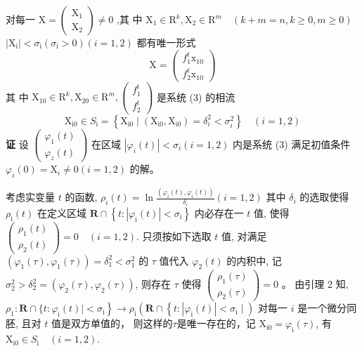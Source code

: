 \documentclass[12pt,a4paper,UTF8]{ctexart}
\begin{document}
对每一 $\mathrm{X}=\left(\begin{array}{l}\mathrm{X}_1 \\ \mathrm{X}_2\end{array}\right) \neq 0$ ,其 中 $\mathrm{X}_1 \in \mathrm{R}^k, \mathrm{X}_2 \in \mathrm{R}^m \quad(k+m=n, k \geq 0, m \geq 0)$ $\left|\mathrm{X}_{\mathrm{i}}\right|<\sigma_{\mathrm{i}}\left(\sigma_{\mathrm{i}}>0\right)(i=1,2)$ 都有唯一形式
$$
\mathrm{X}=\left(\begin{array}{l}
f_1^t \mathrm{x}_{10} \\
f_2^t \mathrm{x}_{10}
\end{array}\right)
$$
其 中 $\mathrm{X}_{10} \in \mathrm{R}^k, \mathrm{X}_{20} \in \mathrm{R}^m ,\left(\begin{array}{l}f_1^t \\ f_2^{t}\end{array}\right)$ 是系统 (3) 的相流
$$
\mathrm{X}_{\mathrm{i} 0} \in S_{\mathrm{i}}=\left\{\mathrm{X}_{\mathrm{i} 0} \mid\left(\mathrm{X}_{\mathrm{i} 0}, \mathrm{X}_{\mathrm{i} 0}\right)=\delta_i^2<\sigma_i^2\right\} \quad(i=1,2)
$$
\textbf{证 }设 $\left(\begin{array}{l}\varphi_1(t) \\ \varphi_z(t)\end{array}\right)$ 在区域 $\left|\varphi_i(t)\right|<\sigma_i(i=1,2)$ 内是系统 (3) 满足初值条件 $\varphi_i(0)=\mathrm{X}_i \neq 0(i=1,2)$ 的解。

考虑实变量 $t$ 的函数, $\rho_i(t)=\ln \frac{\left(\varphi_i(t), \varphi_i(t)\right)}{\delta_i}(i=1,2)$ 其中 $\delta_i$ 的选取使得
$\rho_{\mathrm{i}}(t)$ 在定义区域 $\boldsymbol{R} \cap\left\{t:\left|\varphi_{\mathrm{i}}(t)\right|<\sigma_{\mathrm{i}}\right\}$ 内必存在一 $t$ 值, 使得 $\left(\begin{array}{l}\rho_1(t) \\ \rho_2(t)\end{array}\right)=0 \quad(i=1,2)$.
只须按如下选取 $t$ 值, 对满足 $\left(\varphi_1(\tau), \varphi_1(\tau)\right)=\delta_1^2<\sigma_1^2$ 的 $\tau$ 值代入 $\varphi_2(t)$ 的内积中, 记$\sigma_2^2>\delta_2^2=\left(\varphi_2(\tau), \varphi_2(\tau)\right)$, 则存在 $\tau$ 使得 $\left(\begin{array}{l}\rho_1(\tau) \\ \rho_2(\tau)\end{array}\right)=0$ 。 由引理 2 知, $\rho_1: \mathbf{R} \cap\{t:\left.\varphi_{\mathrm{i}}(t) \mid<\sigma_{\mathrm{i}}\right\} \rightarrow \rho_{\mathrm{i}}\left(\mathbf{R} \cap\left\{t:\left|\varphi_{\mathrm{i}}(t)\right|<\sigma_{\mathrm{i}} \mid\right)\right.$ 对每一 $i$ 是一个微分同胚, 且对 $t$ 值是双方单值的，
则这样的$\tau$是唯一存在的，记 $\mathrm{X}_{\mathrm{i} 0}={\varphi}_{\mathrm{i}}(\tau)$, 有 $\mathrm{X}_{\mathrm{i} 0} \in S_{\mathrm{i}} \quad(i=1,2)$.
\end{document}
